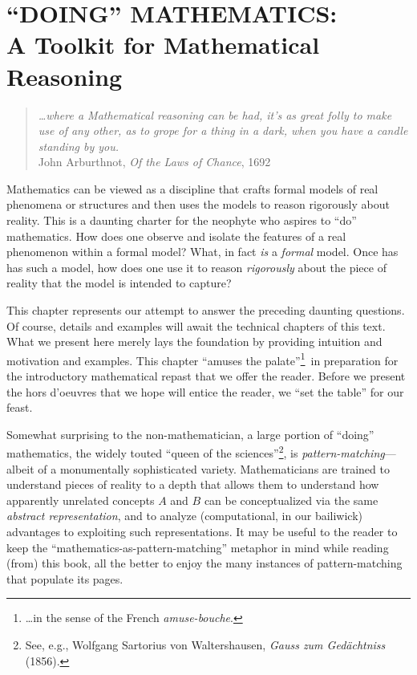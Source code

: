
\chapter{``DOING'' MATHEMATICS: \\
A Toolkit for Mathematical Reasoning}
\label{ch:doingmath}


\begin{quote}
{\em \ldots where a Mathematical reasoning can be had, it's as great
  folly to make use of any other, as to grope for a thing in a dark,
  when you have a candle standing by you.} \\
\hspace*{2in} John Arburthnot, {\it Of the Laws of Chance}, 1692
\end{quote}

\noindent
Mathematics can be viewed as a discipline that crafts formal models of
real phenomena or structures and then uses the models to reason
rigorously about reality.  This is a daunting charter for the neophyte
who aspires to ``do'' mathematics.  How does one observe and isolate
the features of a real phenomenon within a formal model?  What, in
fact {\em is} a {\em formal} model.  Once has has such a model, how
does one use it to reason {\em rigorously} about the piece of reality
that the model is intended to capture?

This chapter represents our attempt to answer the preceding daunting
questions.  Of course, details and examples will await the technical
chapters of this text.  What we present here merely lays the
foundation by providing intuition and motivation and examples.  This
chapter ``amuses the palate''\footnote{\ldots in the sense of the
  French {\em amuse-bouche}.}~in preparation for the introductory
mathematical repast that we offer the reader.  Before we present the
hors d'oeuvres that we hope will entice the reader, we ``set the
table'' for our feast.


Somewhat surprising to the non-mathematician, a large portion of
``doing'' mathematics, the widely touted ``queen of the
sciences''\footnote{See, e.g., Wolfgang Sartorius von Waltershausen,
  {\it Gauss zum Ged\"{a}chtniss} (1856).}, is {\em
  pattern-matching}---albeit of a monumentally sophisticated variety.
Mathematicians are trained to understand pieces of reality to a depth
that allows them to understand how apparently unrelated concepts $A$
and $B$ can be conceptualized via the same {\em abstract
  representation}, and to analyze (computational, in our bailiwick)
advantages to exploiting such representations.  It may be useful to
the reader to keep the ``mathematics-as-pattern-matching'' metaphor in
mind while reading (from) this book, all the better to enjoy the many
instances of pattern-matching that populate its pages.

